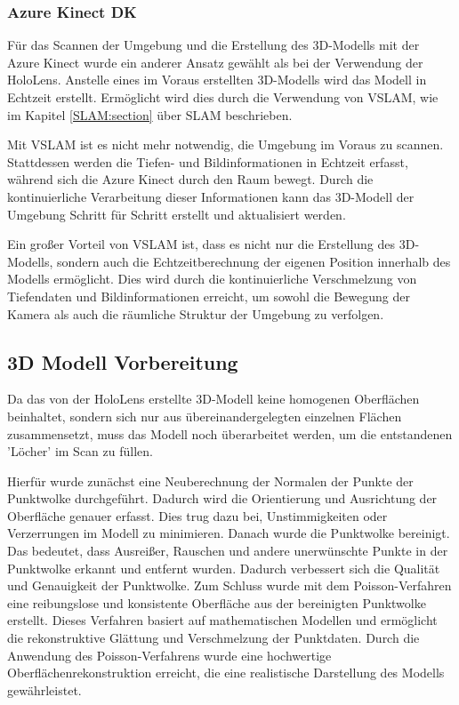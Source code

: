         \subsubsection{Azure Kinect \ac{DK}} \label{kinect:subsubsection}
        Für das Scannen der Umgebung und die Erstellung des 3D-Modells mit der Azure Kinect wurde ein anderer Ansatz gewählt als bei der Verwendung der HoloLens. Anstelle eines im Voraus erstellten 3D-Modells wird das Modell in Echtzeit erstellt. Ermöglicht wird dies durch die Verwendung von \ac{VSLAM}, wie im Kapitel \ref{SLAM:section} über \ac{SLAM} beschrieben.

        Mit \ac{VSLAM} ist es nicht mehr notwendig, die Umgebung im Voraus zu scannen. Stattdessen werden die Tiefen- und Bildinformationen in Echtzeit erfasst, während sich die Azure Kinect durch den Raum bewegt. Durch die kontinuierliche Verarbeitung dieser Informationen kann das 3D-Modell der Umgebung Schritt für Schritt erstellt und aktualisiert werden.

        Ein großer Vorteil von \ac{VSLAM} ist, dass es nicht nur die Erstellung des 3D-Modells, sondern auch die Echtzeitberechnung der eigenen Position innerhalb des Modells ermöglicht. Dies wird durch die kontinuierliche Verschmelzung von Tiefendaten und Bildinformationen erreicht, um sowohl die Bewegung der Kamera als auch die räumliche Struktur der Umgebung zu verfolgen.

    \subsection{3D Modell Vorbereitung} \label{3d_modell_vorbereitung:subsection}
    Da das von der HoloLens erstellte 3D-Modell keine homogenen Oberflächen beinhaltet, sondern sich nur aus übereinandergelegten einzelnen Flächen zusammensetzt, muss das Modell noch überarbeitet werden, um die entstandenen 'Löcher' im Scan zu füllen.
    
    Hierfür wurde zunächst eine Neuberechnung der Normalen der Punkte der Punktwolke durchgeführt. Dadurch wird die Orientierung und Ausrichtung der Oberfläche genauer erfasst. Dies trug dazu bei, Unstimmigkeiten oder Verzerrungen im Modell zu minimieren. Danach wurde die Punktwolke bereinigt. Das bedeutet, dass Ausreißer, Rauschen und andere unerwünschte Punkte in der Punktwolke erkannt und entfernt wurden. Dadurch verbessert sich die Qualität und Genauigkeit der Punktwolke. Zum Schluss wurde mit dem Poisson-Verfahren eine reibungslose und konsistente Oberfläche aus der bereinigten Punktwolke erstellt. Dieses Verfahren basiert auf mathematischen Modellen und ermöglicht die rekonstruktive Glättung und Verschmelzung der Punktdaten. Durch die Anwendung des Poisson-Verfahrens wurde eine hochwertige Oberflächenrekonstruktion erreicht, die eine realistische Darstellung des Modells gewährleistet.

